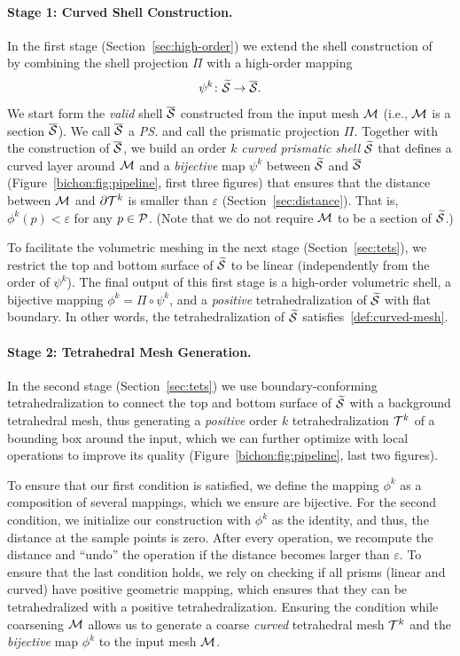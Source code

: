\paragraph{Stage 1: Curved Shell Construction.}
In the first stage (Section~\ref{sec:high-order}) we extend the shell construction of~\cite{jiang2020bijective} by combining the shell projection $\Pi$ with {a} high-order mapping 
\[
\psi^k \colon \prS \to \PS.
\]
We start form the \emph{valid} shell $\PS$ constructed from the input mesh $\M$ (i.e., $\M$ is a section $\PS$). We call $\PS$ a \emph{\ps{}} and call the prismatic projection $\Pi$. Together with the construction of $\PS$, we build an order $k$ \emph{curved prismatic shell} $\prS$ that defines a curved layer around $\M$ and a \emph{bijective} map $\psi^k$ between $\prS$ and $\PS$ (Figure~\ref{bichon:fig:pipeline}, first three figures) that ensures that the distance between $\M$ and $\partial\T^k$ is smaller than $\varepsilon$ (Section~\ref{sec:distance}). That is, $\phi^k(p) < \varepsilon$ for any $p\in\P$. (Note that we do not require $\M$ to be a section of $\prS$.)

To facilitate the volumetric meshing in the next stage (Section~\ref{sec:tets}), we restrict the top and bottom surface of $\prS$ to be linear (independently from the order of $\psi^k$). The final output of this first stage is a high-order volumetric shell,
a bijective mapping $\phi^k = \Pi \circ \psi^k$,
and a \emph{positive} tetrahedralization of $\prS$ with flat boundary. In other words, the tetrahedralization of $\prS$ satisfies~\ref{def:curved-mesh}.

\paragraph{Stage 2: Tetrahedral Mesh Generation.}
In the second stage (Section~\ref{sec:tets}) we use boundary-conforming tetrahedralization to connect the top and bottom surface of $\prS$ with a background tetrahedral mesh, thus generating a \emph{positive} order $k$ tetrahedralization $\T^k$ of a bounding box around the input, which we can further optimize with local operations to improve its quality  (Figure~\ref{bichon:fig:pipeline}, last two figures). %


To ensure that our first condition is satisfied{,} we define the mapping $\phi^k$ as a composition of several mappings{,} which we ensure are bijective. 
For the second condition, we initialize our construction with $\phi^k$ {as} the identity, {and} thus, the distance at the sample points is zero. 
After every operation, we recompute the distance and ``undo'' the operation if the distance becomes larger than $\varepsilon$. To ensure that the last condition holds, we rely on checking if all prisms (linear and curved) have positive geometric mapping, which {ensures} that they can be tetrahedralized with a positive tetrahedralization. 
Ensuring the condition while coarsening $\M$ {allows} us to generate a coarse \emph{curved} tetrahedral mesh $\T^k$ and the \emph{bijective} map $\phi^k$ to the input mesh $\M$.


